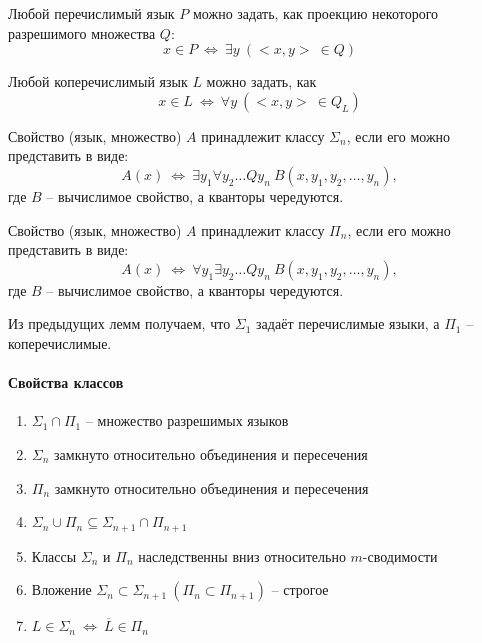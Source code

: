 \documentclass[11pt]{article}
\begin{document}
\begin{lemma}[следствие]
  Любой перечислимый язык $P$ можно задать, как проекцию некоторого 
  разрешимого множества $Q$:
  \[x \in P \ \Longleftrightarrow \ \exists y \ (<x, y> \ \in Q)\]
\end{lemma}

\begin{lemma}
  Любой коперечислимый язык $L$ можно задать, как 
  \[x \in L \ \Longleftrightarrow \ \forall y \ (<x, y> \ \in Q_L)\]
\end{lemma}

\begin{definition}
  Свойство (язык, множество) $A$ принадлежит классу $\Sigma_n$, если его 
  можно представить в виде:
  \[A(x) \ \Longleftrightarrow \ \exists y_1 \forall y_2 \ldots Q y_n \
  B(x, y_1, y_2, \ldots, y_n),\]
  где $B$ -- вычислимое свойство, а кванторы чередуются.
\end{definition}

\begin{definition}
  Свойство (язык, множество) $A$ принадлежит классу $\Pi_n$, если его 
  можно представить в виде:
  \[A(x) \ \Longleftrightarrow \ \forall y_1 \exists y_2 \ldots Q y_n \
  B(x, y_1, y_2, \ldots, y_n),\]
  где $B$ -- вычислимое свойство, а кванторы чередуются.
\end{definition}

\begin{remark}
  Из предыдущих лемм получаем, что $\Sigma_1$ задаёт перечислимые языки, 
  а $\Pi_1$ -- коперечислимые.
\end{remark}

\paragraph{Свойства классов}

\begin{enumerate}
  \item $\Sigma_1 \cap \Pi_1$ -- множество разрешимых языков
  \item $\Sigma_n$ замкнуто относительно объединения и пересечения
  \item $\Pi_n$ замкнуто относительно объединения и пересечения
  \item $\Sigma_n \cup \Pi_n \subseteq \Sigma_{n + 1} \cap \Pi_{n + 1}$
  \item Классы $\Sigma_n$ и $\Pi_n$ наследственны вниз относительно 
  $m$-сводимости
  \item Вложение $\Sigma_n \subset \Sigma_{n + 1} \ (\Pi_n \subset 
  \Pi_{n + 1})$ -- строгое
  \item $L \in \Sigma_n \ \Longleftrightarrow \ \overline{L} \in \Pi_n$
\end{enumerate}
\end{document}
